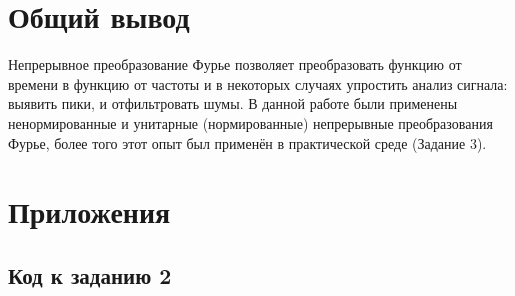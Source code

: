 \documentclass[a4paper, 12pt]{article}
\begin{document}
\newpage
\section{Общий вывод}
Непрерывное преобразование Фурье позволяет преобразовать функцию от времени в функцию от частоты и в некоторых случаях упростить анализ сигнала: выявить пики, и отфильтровать шумы. В данной работе были применены ненормированные и унитарные (нормированные) непрерывные преобразования Фурье, более того этот опыт был применён в практической среде (Задание 3).

\newpage
\section{Приложения}

\subsection*{Код к заданию 2}
\end{document}
